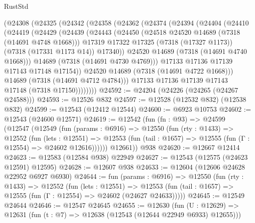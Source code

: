 \begin{lexlean}{RustStd}
\begin{coremodule}
      (@24308
        (@24325
          (@24342
            (@24358
              (@24362
                (@24374
                  (@24394
                    (@24404
                      (@24410
                        (@24419
                          (@24429
                            (@24439
                              (@24443
                                (@24450
                                  (@24518 @24520 @14689 (@7318 (@14691 @4748 @1668)))
                                  @17319
                                  @17322
                                  @17325
                                  (@7318 (@17327 @1173))
                                  (@7318 (@17331 @1173 @14))
                                  @17340))
                              @24520
                              @14689
                              (@7318 (@14691 @4740 @1668)))
                            @14689
                            (@7318 (@14691 @4730 @4769)))
                          @17133
                          @17136
                          @17139
                          @17143
                          @17148
                          @17154))
                      @24520
                      @14689
                      (@7318 (@14691 @4722 @1668)))
                    @14689
                    (@7318 (@14691 @4712 @4784)))
                  @17133
                  @17136
                  @17139
                  @17143
                  @17148
                  (@7318 @17150))))))))
@24592 := @24204 (@24226 (@24265 (@24267 @24588)))
@24593 := @12526 @832
@24597 := @12528 (@12532 @832) (@12538 @832)
@24599 := @12543 (@12412 @12544)
@24600 := @6923 @10753
@24602 := @12543 (@24600 @12571)
@24619 := @12542
    (fun (fn : @93) =>
    @24599
      (@12547
        (@12549
          (fun (params : @6916) =>
          @12550
            (fun (rty : @1433) =>
            @12552
              (fun (lets : @12551) =>
              @12553 (fun (tail : @1657) => @12555 (fun (Γ : @12554) => @24602 @12616))))))
        @12661))
    @938
@24620 := @12667 @12414
@24623 := @12583 (@12584 @938) @22949
@24627 := @12543 (@12575 (@24623 @12591) @12595)
@24628 := @12607 @938
@24633 := @12604 (@12606 @24628 @22952 @6927 @6930)
@24644 := fun (params : @6916) =>
  @12550
    (fun (rty : @1433) =>
    @12552
      (fun (lets : @12551) =>
      @12553 (fun (tail : @1657) => @12555 (fun (Γ : @12554) => @24602 (@24627 @24633)))))
@24645 := @12549 @24644
@24646 := @12547 @24645
@24655 := @12630
    (fun (U : @12629) => @12631 (fun (t : @7) => @12638 (@12543 (@12644 @22949 @6933) @12655)))

\end{coremodule}
\end{lexlean}
